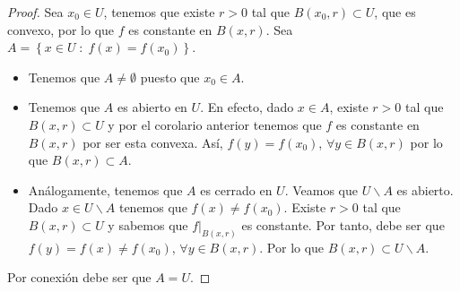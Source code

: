 \begin{proof}
	Sea $\displaystyle x_{0} \in U $, tenemos que existe $\displaystyle r > 0 $ tal que $\displaystyle B\left(x_{0}, r\right)\subset U $, que es convexo, por lo que $\displaystyle f $ es constante en $\displaystyle B\left(x,r\right) $. Sea $\displaystyle A = \left\{ x \in U \; : \; f\left(x\right) = f\left(x_{0}\right)\right\}  $. 
	\begin{itemize}
	\item Tenemos que $\displaystyle A \neq \emptyset $ puesto que $\displaystyle x_{0} \in A $. 
	\item Tenemos que $\displaystyle A $ es abierto en $\displaystyle U $. En efecto, dado $\displaystyle x \in A $, existe $\displaystyle r > 0 $ tal que $\displaystyle B\left(x,r\right) \subset U $ y por el corolario anterior tenemos que $\displaystyle f $ es constante en $\displaystyle B\left(x,r\right) $ por ser esta convexa. Así, $\displaystyle f\left(y\right) = f\left(x_{0}\right) $, $\displaystyle \forall y \in B\left(x,r\right) $ por lo que $\displaystyle B\left(x,r\right)\subset A $.
	\item Análogamente, tenemos que $\displaystyle A $ es cerrado en $\displaystyle U $. Veamos que $\displaystyle U\backslash A $ es abierto. Dado $\displaystyle x \in U\backslash A $ tenemos que $\displaystyle f\left(x\right) \neq f\left(x_{0}\right) $. Existe $\displaystyle r > 0 $ tal que $\displaystyle B\left(x,r\right)\subset U $ y sabemos que $\displaystyle f|_{B\left(x,r\right)} $ es constante. Por tanto, debe ser que $\displaystyle f\left(y\right) = f\left(x\right) \neq f\left(x_{0}\right) $, $\displaystyle \forall y \in B\left(x,r\right) $. Por lo que $\displaystyle B\left(x,r\right) \subset U\backslash A $.
	\end{itemize}
	Por conexión debe ser que $\displaystyle A = U $. 
\end{proof}

